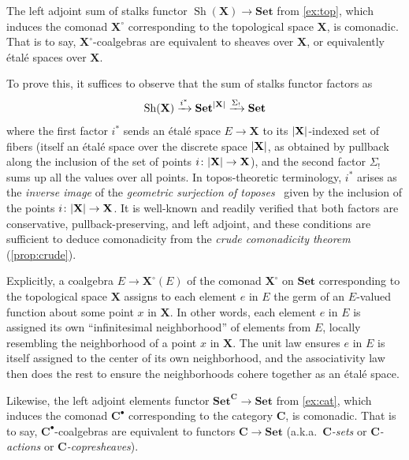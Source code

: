 \documentclass[11pt, oneside, article]{memoir}
\theoremstyle{plain}
\theoremstyle{definition}
\theoremstyle{remark}
\newenvironment{example}
{\renewcommand\qedsymbol{$\lrcorner$}%
  \pushQED{\qed}\myexample}
{\popQED\endmyexample}
\DeclareMathOperator{\Sh}{Sh}
\DeclarePairedDelimiter{\abs}{\lvert}{\rvert}
\newcommand{\xto}[1]{\xrightarrow{#1}}
\newcommand{\bang}{\mathrm{!}}
\newcommand{\namedcat}[1]{\mathbf{#1}}
\newcommand{\cat}[1]{\mathbf{#1}}
\newcommand{\spa}[1]{\mathbf{#1}}
\newcommand{\Set}{\namedcat{Set}}
\newcommand{\pts}[1]{{\abs{#1}}}
\newcommand{\slicel}{\Sigma_\bang}
\newcommand{\fun}[2]{{#2}^{#1}}
\newcommand{\eE}{E}
\newcommand{\bC}{\cat{C}}
\newcommand{\tX}{\spa{X}}
\newcommand{\cX}{\toptocmd{\tX}}
\newcommand{\cbC}{\cattocmd{\bC}}
\newcommand{\cattocmd}[1]{{{#1}^\bullet}}
\newcommand{\toptocmd}[1]{{{#1}^\circ}}
\begin{document}
\begin{example}[Sheaves and presheaves]\label{ex:sheaves}\label{ex:copresheaves}
  The left adjoint sum of stalks functor $\Sh(\tX) \to \Set$ from
  \cref{ex:top}, which induces the comonad $\cX$
  corresponding to the topological space $\tX$, is comonadic. That is
  to say, $\cX$-coalgebras are equivalent to sheaves over
  $\tX$, or equivalently \'etal\'e spaces over $\tX$.

  To prove this, it suffices to observe that the sum of stalks functor
  factors as
  \[\Sh(\tX) \xto{i^*} \Set^{\pts{\tX}} \xto{\slicel} \Set\] where the first factor
  $i^*$ sends an \'etal\'e space $E \to \tX$ to its
  $\pts{\tX}$-indexed set of fibers (itself an \'etal\'e space over
  the discrete space $\pts{\tX}$, as obtained by pullback along the
  inclusion of the set of points $i \colon \pts{\tX} \to \tX$), and
  the second factor $\slicel$ sums up all the values over all
  points. In topos-theoretic terminology, $i^*$ arises as the
  \emph{inverse image} of the \emph{geometric surjection of
    toposes}~\cite[A4.2]{johnstone:elephant} given by the inclusion of
  the points $i \colon \pts{\tX} \to \tX$. It is well-known and
  readily verified that both factors are conservative,
  pullback-preserving, and left adjoint, and these conditions are
  sufficient to deduce comonadicity from the \emph{crude comonadicity
    theorem} (\cref{prop:crude}).

  Explicitly, a coalgebra $\eE \to \cX(\eE)$ of the comonad
  $\cX$ on $\Set$ corresponding to the topological space
  $\tX$ assigns to each element $e$ in $\eE$ the germ of an
  $\eE$-valued function about some point $x$ in $\tX$. In other words,
  each element $e$ in $\eE$ is assigned its own ``infinitesimal
  neighborhood'' of elements from $\eE$, locally resembling the
  neighborhood of a point $x$ in $\tX$. The unit law ensures $e$ in
  $\eE$ is itself assigned to the center of its own neighborhood, and
  the associativity law then does the rest to ensure the neighborhoods
  cohere together as an \'etal\'e space.


  Likewise, the left adjoint elements functor
  $\fun{\bC}{\Set} \to \Set$ from \cref{ex:cat}, which induces the
  comonad $\cbC$ corresponding to the category $\bC$, is
  comonadic. That is to say, $\cbC$-coalgebras are
  equivalent to functors $\bC \to \Set$ (a.k.a.\ \emph{$\bC$-sets} or
  \emph{$\bC$-actions} or \emph{$\bC$-copresheaves}).


\end{example}
\end{document}
